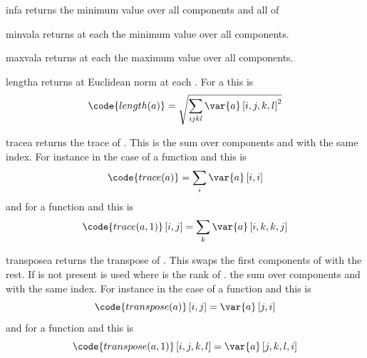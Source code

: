 \begin{funcdesc}{inf}{a}
returns the minimum value over all components and all \DataSamplePoints of 
\end{funcdesc}



\begin{funcdesc}{minval}{a}
returns at each \DataSamplePoints the minimum value over all components.
\end{funcdesc}

\begin{funcdesc}{maxval}{a}
returns at each \DataSamplePoints the maximum value over all components.
\end{funcdesc}

\begin{funcdesc}{length}{a}
returns at Euclidean norm at each \DataSamplePoints. For a \RankFour {} this is
\begin{equation}
\code{length(a)}=\sqrt{\sum_{ijkl} \var{a} \left[i,j,k,l\right]^2}
\end{equation}
\end{funcdesc}
\begin{funcdesc}{trace}{a}
returns the trace of . This is the sum over components  and  with the same index. For instance in the
case of a \RankTwo function and this is
\begin{equation}
\code{trace(a)}=\sum_{i} \var{a} \left[i,i\right]
\end{equation}
and for a \RankFour function and   this is
\begin{equation}
\code{trace(a,1)}\left[i,j\right]=\sum_{k} \var{a} \left[i,k,k,j\right]
\end{equation}
\end{funcdesc}

\begin{funcdesc}{transpose}{a}
returns the transpose of . This swaps the first  components of  with the rest. If  is not
present  is used where  is the rank of .
 the sum over components  and  with the same index. For instance in the
case of a \RankTwo function and this is
\begin{equation}
\code{transpose(a)}\left[i,j\right]=\var{a} \left[j,i\right]
\end{equation}
and for a \RankFour function and   this is
\begin{equation}
\code{transpose(a,1)}\left[i,j,k,l\right]=\var{a} \left[j,k,l,i\right]
\end{equation}
\end{funcdesc}

